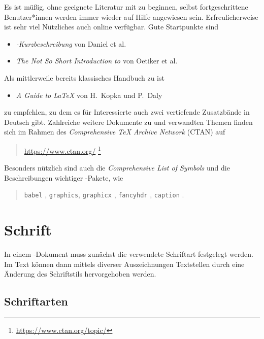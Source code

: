 Es ist müßig, ohne geeignete Literatur mit \latex zu beginnen, selbst
fortgeschrittene Benutzer*innen werden immer wieder auf Hilfe angewiesen
sein. Erfreulicherweise ist sehr viel Nützliches auch online verfügbar.
Gute Startpunkte sind \zB
%
\begin{itemize}
\item \emph{\textrm{\LaTeXe}-Kurzbeschreibung} von Daniel et al.\ \cite{Daniel2018}
\item \emph{The Not So Short Introduction to \textrm{\LaTeXe}}
            von Oetiker et al.\ \cite{Oetiker2021}
\end{itemize}
%
\noindent
Als mittlerweile bereits klassisches Handbuch zu \latex ist
%
\begin{itemize}
  \item \emph{A Guide to \textrm{\LaTeX}} von H.~Kopka und P.~Daly \cite{Kopka2003}
\end{itemize}
%
zu empfehlen, zu dem es für Interessierte auch zwei vertiefende
Zusatzbände in Deutsch gibt. Zahlreiche weitere Dokumente zu
\latex und verwandten Themen finden sich \ua im Rahmen des {\em
Comprehensive TeX Archive Network} (CTAN) auf
\begin{quote}
	\url{https://www.ctan.org/}%
	\footnote{\url{https://www.ctan.org/topic/}}
\end{quote}
%
Besonders nützlich sind auch die
\emph{Comprehensive List of \textrm{\latex} Symbols} \cite{Pakin2021}
und die Beschreibungen wichtiger \latex-Pakete, wie
%
\begin{quote}
  \texttt{babel} \cite{Bezos2021},\newline
  \texttt{graphics}, \texttt{graphicx} \cite{Carlisle2020},\newline
  \texttt{fancyhdr} \cite{Oostrum2021},\newline
  \texttt{caption} \cite{Sommerfeldt2020}.
\end{quote}


\section{Schrift}

In einem \latex-Dokument muss zunächst die verwendete Schriftart festgelegt werden. Im Text können dann mittels diverser Auszeichnungen Textstellen durch eine Änderung des Schriftstils hervorgehoben werden.

\subsection{Schriftarten}

